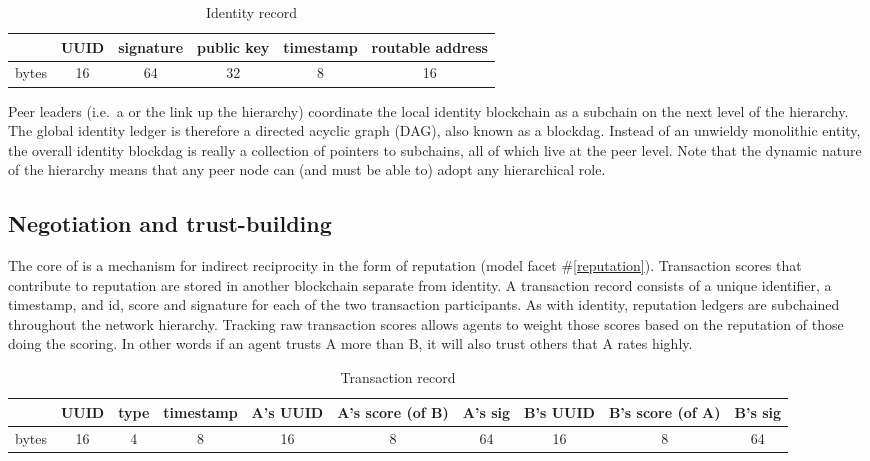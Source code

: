 \begin{table}[h!]
	\centering
	\begin{tabular}{ |l||c|c|c|c|c| }
		\hline
		& UUID & signature & public key & timestamp & routable address \\
		\hline
		bytes & 16 & 64 & 32 & 8 & 16 \\
		\hline
	\end{tabular}
	\caption{Identity record}
	\label{tab:identity}
\end{table}

Peer leaders (i.e.\ a or the link up the hierarchy) coordinate the local identity blockchain as a subchain on the next level of the hierarchy.
The global identity ledger is therefore a directed acyclic graph (DAG), also known as a blockdag.
Instead of an unwieldy monolithic entity, the overall identity blockdag is really a collection of pointers to subchains, all of which live at the peer level.
Note that the dynamic nature of the hierarchy means that any peer node can (and must be able to) adopt any hierarchical role.

\begin{ppl}

\end{ppl}


\subsection{Negotiation and trust-building}\label{subsec:negotiation}

The core of \projectName is a mechanism for indirect reciprocity in the form of reputation (model facet \#\ref{reputation}).
Transaction scores that contribute to reputation are stored in another blockchain separate from identity.
A transaction record consists of a unique identifier, a timestamp, and id, score and signature for each of the two transaction participants.
As with identity, reputation ledgers are subchained throughout the network hierarchy.
Tracking raw transaction scores allows agents to weight those scores based on the reputation of those doing the scoring.
In other words if an agent trusts A more than B, it will also trust others that A rates highly.

\begin{table}[h!]
	\centering
	\begin{tabular}{ |l||c|c|c|c|c|c|c|c|c| }
		\hline
		& UUID & type & timestamp & A's UUID  & A's score (of B) & A's sig & B's UUID &  B's score (of A) & B's sig \\
		\hline
		bytes & 16 & 4 & 8 & 16 & 8 & 64 & 16 & 8 & 64 \\
		\hline
	\end{tabular}
	\caption{Transaction record}
	\label{tab:reputation}
\end{table}

